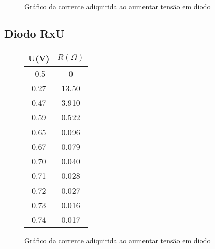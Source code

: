         \begin{figure} [H] 
            \centering
            \caption{Gráfico da corrente adiquirida ao aumentar tensão em diodo}
            \label{fig:graphD}
        \end{figure}


    \subsection{Diodo RxU}
        \begin{figure} [H] 
            \centering
            \begin{tabular}{||c | c||}
                \hline
                U(V)    &$R(\Omega)$\\
                \hline
                -0.5    &   0       \\     
                0.27    &   13.50   \\ 
                0.47    &   3.910   \\ 
                0.59    &   0.522   \\ 
                0.65    &   0.096   \\ 
                0.67    &   0.079   \\ 
                0.70    &   0.040   \\ 
                0.71    &   0.028   \\ 
                0.72    &   0.027   \\ 
                0.73    &   0.016   \\
                0.74    &   0.017   \\
                \hline
            \end{tabular}
            \caption{Gráfico da corrente adiquirida ao aumentar tensão em diodo}
            \label{fig:tableD2}
        \end{figure}

